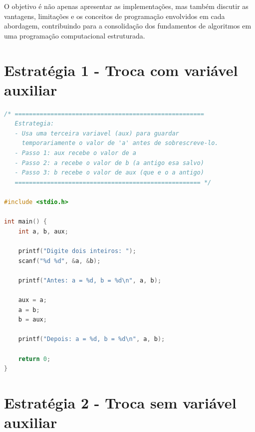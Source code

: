 \documentclass[12pt, a4paper]{article}
\begin{document}
O objetivo é não apenas apresentar as implementações, mas também discutir as vantagens, limitações e os conceitos de programação envolvidos em cada abordagem, contribuindo para a consolidação dos fundamentos de algoritmos em uma programação computacional estruturada.
\pagebreak

\section*{Estratégia 1 - Troca com variável auxiliar}
\begin{lstlisting}[language=C, caption={Troca com variável auxiliar}, label={lst:q1}]
/* =====================================================
   Estrategia:
   - Usa uma terceira variavel (aux) para guardar
     temporariamente o valor de 'a' antes de sobrescreve-lo.
   - Passo 1: aux recebe o valor de a
   - Passo 2: a recebe o valor de b (a antigo esa salvo)
   - Passo 3: b recebe o valor de aux (que e o a antigo)
   ==================================================== */

#include <stdio.h>

int main() {
    int a, b, aux;

    printf("Digite dois inteiros: ");
    scanf("%d %d", &a, &b);

    printf("Antes: a = %d, b = %d\n", a, b);

    aux = a;
    a = b;
    b = aux;

    printf("Depois: a = %d, b = %d\n", a, b);

    return 0;
}
\end{lstlisting}


    

\section*{Estratégia 2 - Troca sem variável auxiliar}
\end{document}
